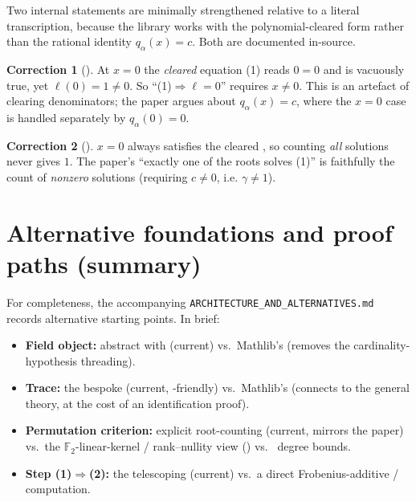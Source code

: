 \documentclass[11pt]{article}
\theoremstyle{definition}
\newtheorem{correction}{Correction}
\begin{document}
Two internal statements are minimally strengthened relative to a literal
transcription, because the library works with the polynomial-cleared form
 rather than the rational identity $q_\alpha(x)=c$. Both are documented
in-source.

\begin{correction}[]\label{cor:eqn2}
At $x=0$ the \emph{cleared} equation (1) reads $0=0$ and is vacuously true, yet
$\ell(0)=1\neq0$. So ``(1)$\Rightarrow\ell=0$'' requires $x\neq0$. This is an
artefact of clearing denominators; the paper argues about $q_\alpha(x)=c$, where
the $x=0$ case is handled separately by $q_\alpha(0)=0$.
\end{correction}

\begin{correction}[]
$x=0$ always satisfies the cleared , so counting \emph{all} solutions
never gives $1$. The paper's ``exactly one of the roots solves (1)'' is
faithfully the count of \emph{nonzero} solutions (requiring $c\neq0$, i.e.
$\gamma\neq1$).
\end{correction}

\section{Alternative foundations and proof paths (summary)}

For completeness, the accompanying \texttt{ARCHITECTURE\_AND\_ALTERNATIVES.md}
records alternative starting points. In brief:
\begin{itemize}[nosep]
  \item \textbf{Field object:} abstract \lc{[Field L][Fintype L][CharP L 2]} with
     (current) vs.\ Mathlib's  (removes the
    cardinality-hypothesis threading).
  \item \textbf{Trace:} the bespoke  (current, -friendly)
    vs.\ Mathlib's  (connects to the general theory, at the
    cost of an identification proof).
  \item \textbf{Permutation criterion:} explicit root-counting (current, mirrors
    the paper) vs.\ the $\mathbb{F}_2$-linear-kernel / rank--nullity view
    () vs.\  degree bounds.
  \item \textbf{Step (1)$\Rightarrow$(2):} the  telescoping
    (current) vs.\ a direct Frobenius-additive /
    computation.
\end{itemize}
\end{document}
